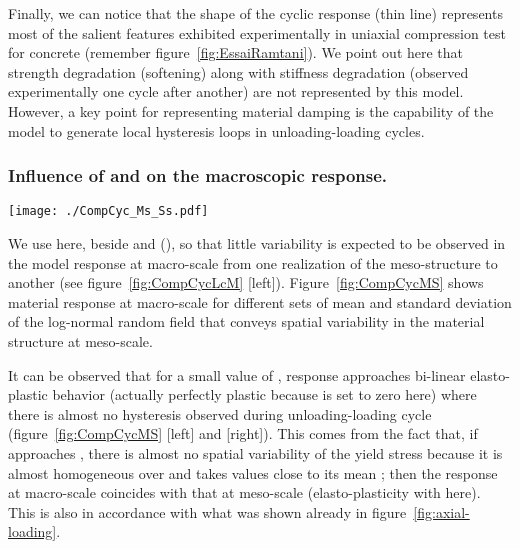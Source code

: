 \documentclass[12p]{amsart}
\begin{document}
Finally, we can notice that the shape of the cyclic response (thin line) represents most of the salient features exhibited experimentally in uniaxial compression test for concrete (remember figure~\ref{fig:EssaiRamtani}). We point out here that strength degradation (softening) along with stiffness degradation (observed experimentally one cycle after another) are not represented by this model. However, a key point for representing material damping is the capability of the model to generate local hysteresis loops in unloading-loading cycles.


\subsubsection{Influence of  and  on the macroscopic response.}

\begin{figure*}[htb]
\begin{center}
 \texttt{[image: ./CompCyc\_Ms\_Ss.pdf]}
\caption{Sample mean (plain line) plus/minus standard deviation (dashed lines) response at macro-scale computed from a sample of 100 different realizations of the material structure at meso-scale. Meso-structures are generated with different targeted mean  and coefficients of variation  for the log-normal marginal law: [left] ~MPa and ; [center] ~MPa and ; [right]  and ~MPa.}
\label{fig:CompCycMS}
\end{center}
\end{figure*}

We use here, beside  and  (),  so that little variability is expected to be observed in the model response at macro-scale from one realization of the meso-structure to another (see figure~\ref{fig:CompCycLcM} [left]). Figure~\ref{fig:CompCycMS} shows material response at macro-scale for different sets of mean  and standard deviation  of the log-normal random field that conveys spatial variability in the material structure at meso-scale.

It can be observed that for a small value of , response approaches bi-linear elasto-plastic behavior (actually perfectly plastic because  is set to zero here) where there is almost no hysteresis observed during unloading-loading cycle (figure~\ref{fig:CompCycMS} [left] and [right]). This comes from the fact that, if  approaches , there is almost no spatial variability of the yield stress because it is almost homogeneous over  and takes values close to its mean ; then the response at macro-scale coincides with that at meso-scale (elasto-plasticity with  here). This is also in accordance with what was shown already in figure~\ref{fig:axial-loading}.
\end{document}

